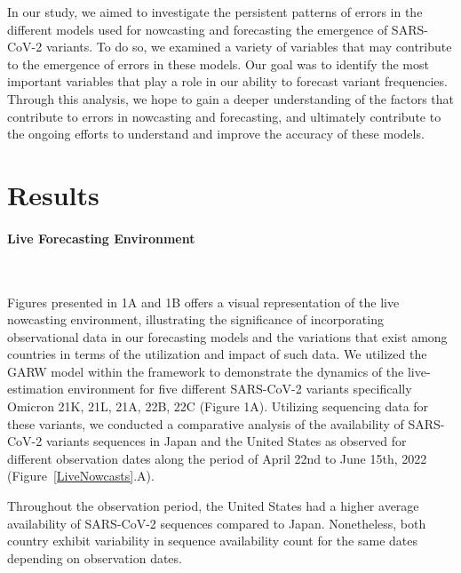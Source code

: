 \documentclass[11pt,oneside,letterpaper]{article}
\begin{document}
In our study, we aimed to investigate the persistent patterns of errors in the different models used for nowcasting and forecasting the emergence of SARS-CoV-2 variants. 
To do so, we examined a variety of variables that may contribute to the emergence of errors in these models. 
Our goal was to identify the most important variables that play a role in our ability to forecast variant frequencies.
Through this analysis, we hope to gain a deeper understanding of the factors that contribute to errors in nowcasting and forecasting, and ultimately contribute to the ongoing efforts to understand and improve the accuracy of these models.



\section*{Results} 


\paragraph{Live Forecasting Environment}\

Figures presented in 1A and 1B offers a visual representation of the live nowcasting environment, illustrating the significance of incorporating observational data in our forecasting models and the variations that exist among countries in terms of the utilization and impact of such data.
We utilized the GARW model within the framework to demonstrate the dynamics of the live-estimation environment for five different SARS-CoV-2 variants specifically Omicron 21K, 21L, 21A, 22B, 22C (Figure 1A).
Utilizing sequencing data for these variants, we conducted a comparative analysis of the availability of SARS-CoV-2 variants sequences in Japan and the United States as observed for different observation dates along the period of April 22nd to June 15th, 2022 (Figure~\ref{LiveNowcasts}.A).

Throughout the observation period, the United States had a higher average availability of SARS-CoV-2 sequences compared to Japan. 
Nonetheless, both country exhibit variability in sequence availability count for the same dates depending on observation dates. 
\end{document}
